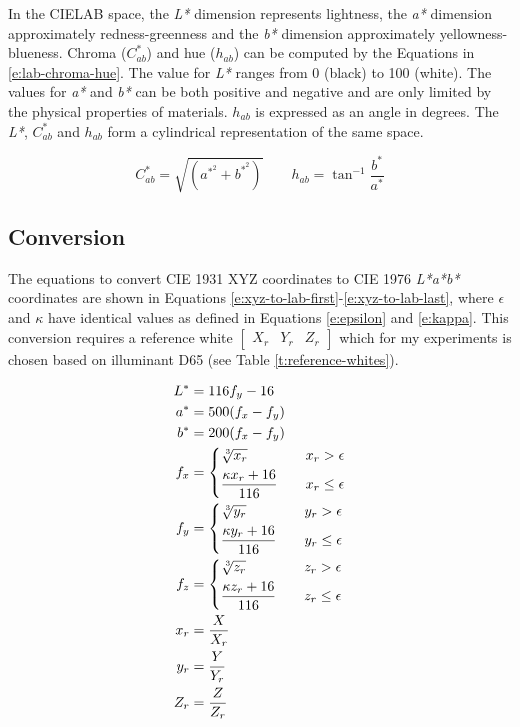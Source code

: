 In the CIELAB space, the \emph{L*} dimension represents lightness, the
\emph{a*} dimension approximately redness-greenness and the \emph{b*}
dimension approximately yellowness-blueness. Chroma ($C^*_{ab}$) and
hue ($h_{ab}$) can be computed by the Equations in
\ref{e:lab-chroma-hue}. The value for \emph{L*} ranges from 0 (black)
to 100 (white). The values for \emph{a*} and \emph{b*} can be both
positive and negative and are only limited by the physical properties
of materials.  $h_{ab}$ is expressed as an angle in degrees. The
\emph{L*}, $C^*_{ab}$ and $h_{ab}$ form a cylindrical representation
of the same space.

\begin{equation}
C^*_{ab} = \sqrt{\left(a^{*^2} + b^{*^2} \right)} \qquad h_{ab} = \tan^{-1} \frac{b^*}{a^*}
\label{e:lab-chroma-hue}
\end{equation}

\subsection{Conversion}

The equations to convert CIE 1931 XYZ coordinates to CIE 1976
\emph{L*a*b*} coordinates are shown in Equations
\ref{e:xyz-to-lab-first}-\ref{e:xyz-to-lab-last}, where $\epsilon$ and
$\kappa$ have identical values as defined in Equations \ref{e:epsilon}
and \ref{e:kappa}. This conversion requires a reference white
$\begin{bmatrix}X_r & Y_r & Z_r\end{bmatrix}$ which for my experiments
is chosen based on illuminant D65 (see Table
\ref{t:reference-whites}).

\begin{align}
L^{*}& = 116f_y - 16
\label{e:xyz-to-lab-first} \\
a^{*}& = 500(f_x - f_y) \\
b^{*}& = 200(f_x - f_y) \\
f_x& = \left\{
\begin{aligned}
&\sqrt[\leftroot{-1}\uproot{2}3]{x_r} & \quad x_r > \epsilon \\
&\frac{\kappa x_r + 16}{116} & \quad x_r \leq \epsilon
\end{aligned}
\right. \\
f_y& = \left\{
\begin{aligned}
&\sqrt[\leftroot{-1}\uproot{2}3]{y_r} & \quad y_r > \epsilon \\
&\frac{\kappa y_r + 16}{116} & \quad y_r \leq \epsilon
\end{aligned}
\right. \\
f_z& = \left\{
\begin{aligned}
&\sqrt[\leftroot{-1}\uproot{2}3]{z_r} & \quad z_r > \epsilon \\
&\frac{\kappa z_r + 16}{116} & \quad z_r \leq \epsilon
\end{aligned}
\right. \\
x_r& = \frac{X}{X_r} \\
y_r& = \frac{Y}{Y_r} \\
Z_r& = \frac{Z}{Z_r}
\label{e:xyz-to-lab-last}
\end{align}

